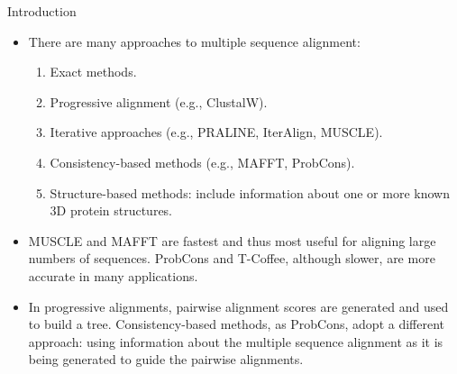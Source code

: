 \begin{frame}{Introduction}

    \begin{itemize}    
        \item There are many approaches to multiple sequence alignment:
        \begin{enumerate}
            \item Exact methods.
            \item Progressive alignment (e.g., ClustalW).
            \item Iterative approaches (e.g., PRALINE, IterAlign, MUSCLE).
            \item Consistency-based methods (e.g., MAFFT, ProbCons).
            \item Structure-based methods: include information about one or more known 3D protein structures.
        \end{enumerate}
        \item MUSCLE and MAFFT are fastest and thus most useful for aligning large numbers of sequences. ProbCons and T-Coffee, although slower, are more accurate in many applications.
        \item In progressive alignments, pairwise alignment scores are generated and used to build a tree. Consistency-based methods, as ProbCons, adopt a different approach: using information about the multiple sequence alignment as it is being generated to guide the pairwise alignments.
    \end{itemize}
    
\end{frame}

